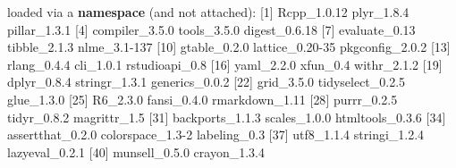 \documentclass[]{article}
\newenvironment{Shaded}{\begin{snugshade}}{\end{snugshade}}
\newcommand{\KeywordTok}[1]{\textcolor[rgb]{0.13,0.29,0.53}{\textbf{{#1}}}}
\newcommand{\DecValTok}[1]{\textcolor[rgb]{0.00,0.00,0.81}{{#1}}}
\newcommand{\FloatTok}[1]{\textcolor[rgb]{0.00,0.00,0.81}{{#1}}}
\newcommand{\StringTok}[1]{\textcolor[rgb]{0.31,0.60,0.02}{{#1}}}
\newcommand{\NormalTok}[1]{{#1}}
\begin{document}
\begin{Shaded}
\begin{Highlighting}[]
\NormalTok{loaded via a }\KeywordTok{namespace} \NormalTok{(and not attached):}
\StringTok{ }\NormalTok{[}\DecValTok{1}\NormalTok{] Rcpp_1}\FloatTok{.0.12}      \NormalTok{plyr_1}\FloatTok{.8.4}       \NormalTok{pillar_1}\FloatTok{.3.1}    
 \NormalTok{[}\DecValTok{4}\NormalTok{] compiler_3}\FloatTok{.5.0}   \NormalTok{tools_3}\FloatTok{.5.0}      \NormalTok{digest_0}\FloatTok{.6.18}   
 \NormalTok{[}\DecValTok{7}\NormalTok{] evaluate_0}\FloatTok{.13}    \NormalTok{tibble_2}\FloatTok{.1.3}     \NormalTok{nlme_3}\FloatTok{.1}\DecValTok{-137}    
\NormalTok{[}\DecValTok{10}\NormalTok{] gtable_0}\FloatTok{.2.0}     \NormalTok{lattice_0}\FloatTok{.20}\DecValTok{-35}  \NormalTok{pkgconfig_2}\FloatTok{.0.2} 
\NormalTok{[}\DecValTok{13}\NormalTok{] rlang_0}\FloatTok{.4.4}      \NormalTok{cli_1}\FloatTok{.0.1}        \NormalTok{rstudioapi_0}\FloatTok{.8}  
\NormalTok{[}\DecValTok{16}\NormalTok{] yaml_2}\FloatTok{.2.0}       \NormalTok{xfun_0}\FloatTok{.4}         \NormalTok{withr_2}\FloatTok{.1.2}     
\NormalTok{[}\DecValTok{19}\NormalTok{] dplyr_0}\FloatTok{.8.4}      \NormalTok{stringr_1}\FloatTok{.3.1}    \NormalTok{generics_0}\FloatTok{.0.2}  
\NormalTok{[}\DecValTok{22}\NormalTok{] grid_3}\FloatTok{.5.0}       \NormalTok{tidyselect_0}\FloatTok{.2.5} \NormalTok{glue_1}\FloatTok{.3.0}      
\NormalTok{[}\DecValTok{25}\NormalTok{] R6_2}\FloatTok{.3.0}         \NormalTok{fansi_0}\FloatTok{.4.0}      \NormalTok{rmarkdown_1}\FloatTok{.11}  
\NormalTok{[}\DecValTok{28}\NormalTok{] purrr_0}\FloatTok{.2.5}      \NormalTok{tidyr_0}\FloatTok{.8.2}      \NormalTok{magrittr_1}\FloatTok{.5}    
\NormalTok{[}\DecValTok{31}\NormalTok{] backports_1}\FloatTok{.1.3}  \NormalTok{scales_1}\FloatTok{.0.0}     \NormalTok{htmltools_0}\FloatTok{.3.6} 
\NormalTok{[}\DecValTok{34}\NormalTok{] assertthat_0}\FloatTok{.2.0} \NormalTok{colorspace_1}\FloatTok{.3}\DecValTok{-2} \NormalTok{labeling_0}\FloatTok{.3}    
\NormalTok{[}\DecValTok{37}\NormalTok{] utf8_1}\FloatTok{.1.4}       \NormalTok{stringi_1}\FloatTok{.2.4}    \NormalTok{lazyeval_0}\FloatTok{.2.1}  
\NormalTok{[}\DecValTok{40}\NormalTok{] munsell_0}\FloatTok{.5.0}    \NormalTok{crayon_1}\FloatTok{.3.4}    
\end{Highlighting}
\end{Shaded}
\end{document}
